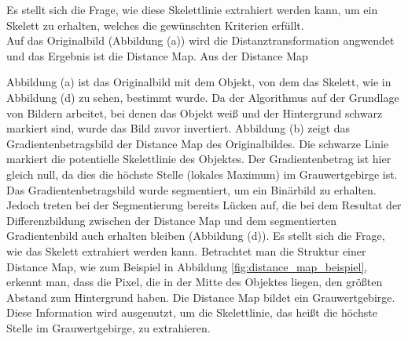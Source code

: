 Es stellt sich die Frage, wie diese Skelettlinie extrahiert werden
kann, um ein Skelett zu erhalten, welches die gewünschten Kriterien
erfüllt.\\  
Auf das Originalbild (Abbildung (a)) wird die Distanztransformation
angwendet und das Ergebnis ist die Distance Map. Aus der Distance
Map 

Abbildung (a) ist das Originalbild mit dem Objekt, von dem das Skelett, wie in Abbildung (d) zu sehen, bestimmt wurde. Da der Algorithmus auf der Grundlage von Bildern arbeitet, bei denen das Objekt weiß und der Hintergrund schwarz markiert sind,
wurde das Bild zuvor invertiert. Abbildung (b) zeigt das Gradientenbetragsbild der Distance Map des Originalbildes. Die schwarze Linie markiert die potentielle Skelettlinie des Objektes. Der Gradientenbetrag ist hier gleich null, da dies die höchste Stelle (lokales Maximum) im Grauwertgebirge ist. Das Gradientenbetragsbild wurde segmentiert, um ein Binärbild zu erhalten. Jedoch treten bei der Segmentierung
bereits Lücken auf, die bei dem Resultat der Differenzbildung zwischen der Distance Map und dem segmentierten Gradientenbild auch erhalten bleiben (Abbildung (d)).
Es stellt sich die Frage, wie das Skelett extrahiert werden kann. Betrachtet man die Struktur einer
Distance Map, wie zum Beispiel in Abbildung \ref{fig:distance_map_beispiel}, erkennt man, dass die Pixel,
die in der Mitte des Objektes liegen, den größten Abstand zum Hintergrund haben. Die Distance Map bildet ein Grauwertgebirge. Diese Information wird ausgenutzt, um die Skelettlinie, das heißt die höchste Stelle
im Grauwertgebirge, zu extrahieren. \\